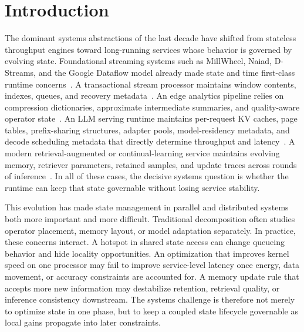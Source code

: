 \documentclass[acmsmall,screen,review]{acmart}
\newcommand{\sysproblem}{state management in parallel and distributed systems\xspace}
\begin{document}
\maketitle

\section{Introduction}

The dominant systems abstractions of the last decade have shifted from stateless throughput engines toward long-running services whose behavior is governed by evolving state. Foundational streaming systems such as MillWheel, Naiad, D-Streams, and the Google Dataflow model already made state and time first-class runtime concerns~\cite{akidau2013millwheel,murray2013naiad,zaharia2013dstreams,akidau2015dataflow}. A transactional stream processor maintains window contents, indexes, queues, and recovery metadata~\cite{zhang2017revisiting,zhang2019briskstream,mao2023morphstream}. An edge analytics pipeline relies on compression dictionaries, approximate intermediate summaries, and quality-aware operator state~\cite{zeng2024cstream,zeng2024pecj}. An LLM serving runtime maintains per-request KV caches, page tables, prefix-sharing structures, adapter pools, model-residency metadata, and decode scheduling metadata that directly determine throughput and latency~\cite{kwon2023pagedattention,agrawal2024sarathi,sheng2023slora,yu2025prism,zheng2023sglang,zhang2025jenga}. A modern retrieval-augmented or continual-learning service maintains evolving memory, retriever parameters, retained samples, and update traces across rounds of inference~\cite{wu2023sentistream,zhou2025ferret,li2025global,zhang2026flowrag}. In all of these cases, the decisive systems question is whether the runtime can keep that state governable without losing service stability.

This evolution has made \sysproblem both more important and more difficult. Traditional decomposition often studies operator placement, memory layout, or model adaptation separately. In practice, these concerns interact. A hotspot in shared state access can change queueing behavior and hide locality opportunities. An optimization that improves kernel speed on one processor may fail to improve service-level latency once energy, data movement, or accuracy constraints are accounted for. A memory update rule that accepts more new information may destabilize retention, retrieval quality, or inference consistency downstream. The systems challenge is therefore not merely to optimize state in one phase, but to keep a coupled state lifecycle governable as local gains propagate into later constraints.
\end{document}
